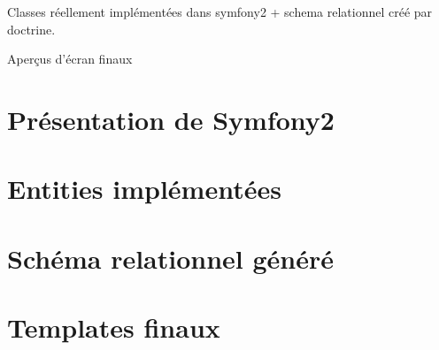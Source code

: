 Classes réellement implémentées dans symfony2 + schema relationnel créé par doctrine.

Aperçus d'écran finaux

\section{Présentation de Symfony2}

\section{Entities implémentées}

\section{Schéma relationnel généré}

\section{Templates finaux}